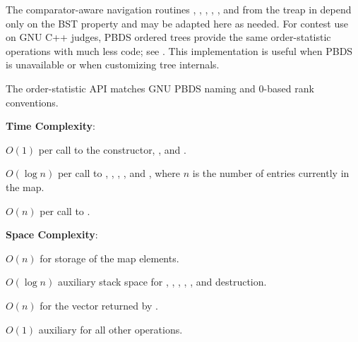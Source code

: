 The comparator-aware navigation routines , , , , , and  from the treap in  depend only on the BST property and may be adapted here as needed. For contest use on GNU C++ judges, PBDS ordered trees provide the same order-statistic operations with much less code; see . This implementation is useful when PBDS is unavailable or when customizing tree internals.

The order-statistic API matches GNU PBDS naming and 0-based rank conventions.

\textbf{Time Complexity}:
\begin{compactitem}
  \item $O(1)$ per call to the constructor, , and .
  \item $O(\log n)$ per call to , , , , and , where $n$ is the number of entries currently in the map.
  \item $O(n)$ per call to .
\end{compactitem}

\textbf{Space Complexity}:
\begin{compactitem}
  \item $O(n)$ for storage of the map elements.
  \item $O(\log n)$ auxiliary stack space for , , , , , and destruction.
  \item $O(n)$ for the vector returned by .
  \item $O(1)$ auxiliary for all other operations.
\end{compactitem}

